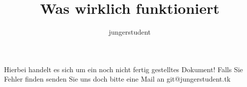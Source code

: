\documentclass[ebook,12pt,oneside,openany]{memoir}
\title{Was wirklich funktioniert}
\author{jungerstudent}
\begin{document}
\maketitle
Hierbei handelt es sich um ein noch nicht fertig gestelltes Dokument! Falls Sie Fehler finden senden Sie uns doch bitte eine Mail an git@jungerstudent.tk
\newpage


%
%
 

\end{document}
